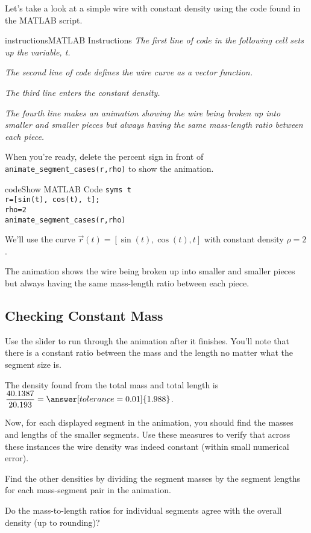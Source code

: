 \documentclass{ximera}
\begin{document}
Let's take a look at a simple wire with constant density using the code found in the MATLAB script.

\begin{expandable}{instructions}{MATLAB Instructions}
\textit{The first line of code in the following cell sets up the variable, t.}

\textit{The second line of code defines the wire curve as a vector function.}

\textit{The third line enters the constant density.}

\textit{The fourth line makes an animation showing the wire being broken up into smaller and smaller pieces but always having the same mass-length ratio between each piece.}

When you're ready, delete the percent sign in front of \texttt{animate\_segment\_cases(r,rho)} to show the animation.
\end{expandable}

\begin{expandable}{code}{Show MATLAB Code}
\texttt{syms t}\\
\texttt{r=[sin(t), cos(t), t];}\\
\texttt{rho=2}\\
\texttt{animate\_segment\_cases(r,rho)}
\end{expandable}

We'll use the curve $\vec{r}(t) = [\sin(t), \cos(t), t]$ with constant density $\rho = 2$.

The animation shows the wire being broken up into smaller and smaller pieces but always having the same mass-length ratio between each piece.

\subsection*{Checking Constant Mass}

Use the slider to run through the animation after it finishes. You'll note that there is a constant ratio between the mass and the length no matter what the segment size is.

\begin{problem}
The density found from the total mass and total length is $\dfrac{40.1387}{20.193} = \answer[tolerance=0.01]{1.988}$.  

Now, for each displayed segment in the animation, you should find the masses and lengths of the smaller segments. Use these measures to verify that across these instances the wire density was indeed constant (within small numerical error).

\begin{feedback}
Find the other densities by dividing the segment masses by the segment lengths for each mass-segment pair in the animation.
\end{feedback}

Do the mass-to-length ratios for individual segments agree with the overall density (up to rounding)? 
\end{problem}
\end{document}
